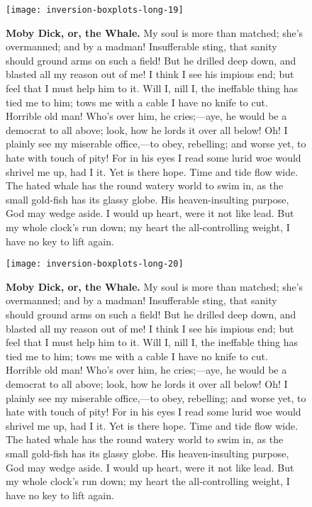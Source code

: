 \documentclass{article}
\begin{document}
\begin{figure}[!htp]
  \begin{center}
      \texttt{[image: inversion-boxplots-long-19]}
    \caption{
        \textbf{Moby Dick, or, the Whale.}
My soul is more than matched; she's overmanned; and by a madman! Insufferable sting, that sanity should ground arms on such a field! But he drilled deep down, and blasted all my reason out of me! I think I see his impious end; but feel that I must help him to it. Will I, nill I, the ineffable thing has tied me to him; tows me with a cable I have no knife to cut. Horrible old man! Who's over him, he cries;—aye, he would be a democrat to all above; look, how he lords it over all below! Oh! I plainly see my miserable office,—to obey, rebelling; and worse yet, to hate with touch of pity! For in his eyes I read some lurid woe would shrivel me up, had I it. Yet is there hope. Time and tide flow wide. The hated whale has the round watery world to swim in, as the small gold-fish has its glassy globe. His heaven-insulting purpose, God may wedge aside. I would up heart, were it not like lead. But my whole clock's run down; my heart the all-controlling weight, I have no key to lift again. 
    }
  \end{center}
\end{figure}

\begin{figure}[!htp]
  \begin{center}
      \texttt{[image: inversion-boxplots-long-20]}
    \caption{
        \textbf{Moby Dick, or, the Whale.}
My soul is more than matched; she's overmanned; and by a madman! Insufferable sting, that sanity should ground arms on such a field! But he drilled deep down, and blasted all my reason out of me! I think I see his impious end; but feel that I must help him to it. Will I, nill I, the ineffable thing has tied me to him; tows me with a cable I have no knife to cut. Horrible old man! Who's over him, he cries;—aye, he would be a democrat to all above; look, how he lords it over all below! Oh! I plainly see my miserable office,—to obey, rebelling; and worse yet, to hate with touch of pity! For in his eyes I read some lurid woe would shrivel me up, had I it. Yet is there hope. Time and tide flow wide. The hated whale has the round watery world to swim in, as the small gold-fish has its glassy globe. His heaven-insulting purpose, God may wedge aside. I would up heart, were it not like lead. But my whole clock's run down; my heart the all-controlling weight, I have no key to lift again. 
    }
  \end{center}
\end{figure}
\end{document}
